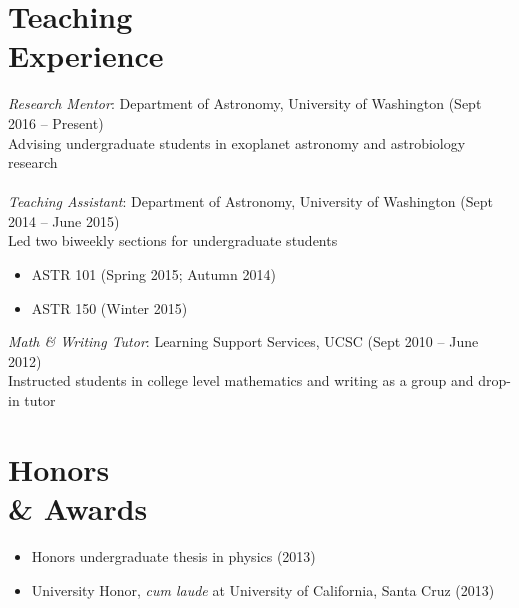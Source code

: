 \documentclass[margin,10pt]{res}
\begin{document}
\begin{resume}
\section{Teaching \\Experience} 
                {\sl Research Mentor}: Department of Astronomy, University of Washington \hfill (Sept 2016 -- Present)\\
                Advising undergraduate students in exoplanet astronomy and astrobiology research\\
                \\
                {\sl Teaching Assistant}: Department of Astronomy, University of Washington   \hfill          (Sept 2014 -- June 2015)\\
                Led two biweekly sections for undergraduate students
                    \begin{itemize}  \itemsep -1pt %
                        \item ASTR 101 (Spring 2015; Autumn 2014)
                        \item ASTR 150 (Winter 2015)
                    \end{itemize}  
                
                {\sl Math \& Writing Tutor}: Learning Support Services, UCSC   \hfill          (Sept 2010 -- June 2012)\\
                Instructed students in college level mathematics and writing as a group and drop-in tutor\\
                 
                                  
\section{Honors \\ \& Awards}
                 \begin{itemize}  \itemsep -1pt %
                    \item Honors undergraduate thesis in physics (2013)
                    \item University Honor, \textit{cum laude} at University of California, Santa Cruz (2013)\\
                 \end{itemize}  
                 

\end{resume}
\end{document}
